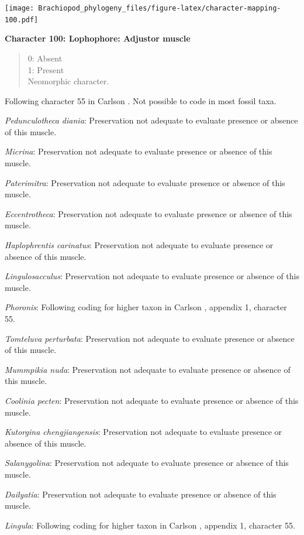 \documentclass[]{book}
\theoremstyle{definition}
\theoremstyle{definition}
\theoremstyle{definition}
\theoremstyle{remark}
\begin{document}
\texttt{[image: Brachiopod\_phylogeny\_files/figure-latex/character-mapping-100.pdf]}

\textbf{Character 100: Lophophore: Adjustor muscle}

\begin{quote}
0: Absent\\
1: Present\\
Neomorphic character.
\end{quote}

Following character 55 in Carlson
\citeyearpar{Carlson1995Phylogeneticrelationships}. Not possible to code
in most fossil taxa.

\emph{Pedunculotheca diania}: Preservation not adequate to evaluate
presence or absence of this muscle.

\emph{Micrina}: Preservation not adequate to evaluate presence or
absence of this muscle.

\emph{Paterimitra}: Preservation not adequate to evaluate presence or
absence of this muscle.

\emph{Eccentrotheca}: Preservation not adequate to evaluate presence or
absence of this muscle.

\emph{Haplophrentis carinatus}: Preservation not adequate to evaluate
presence or absence of this muscle.

\emph{Lingulosacculus}: Preservation not adequate to evaluate presence
or absence of this muscle.

\emph{Phoronis}: Following coding for higher taxon in Carlson
\citeyearpar{Carlson1995Phylogeneticrelationships}, appendix 1,
character 55.

\emph{Tomteluva perturbata}: Preservation not adequate to evaluate
presence or absence of this muscle.

\emph{Mummpikia nuda}: Preservation not adequate to evaluate presence or
absence of this muscle.

\emph{Coolinia pecten}: Preservation not adequate to evaluate presence
or absence of this muscle.

\emph{Kutorgina chengjiangensis}: Preservation not adequate to evaluate
presence or absence of this muscle.

\emph{Salanygolina}: Preservation not adequate to evaluate presence or
absence of this muscle.

\emph{Dailyatia}: Preservation not adequate to evaluate presence or
absence of this muscle.

\emph{Lingula}: Following coding for higher taxon in Carlson
\citeyearpar{Carlson1995Phylogeneticrelationships}, appendix 1,
character 55.
\end{document}
